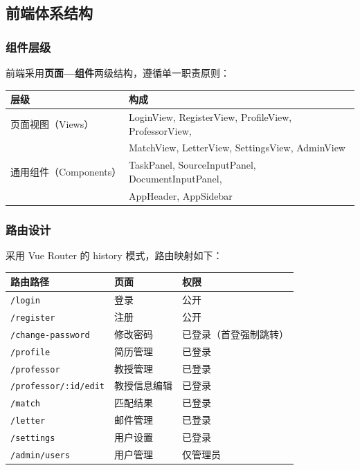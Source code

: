 \documentclass[11pt]{article}
\begin{document}
\subsection{前端体系结构}

\subsubsection{组件层级}

前端采用\textbf{页面—组件}两级结构，遵循单一职责原则：

\begin{center}
\begin{tabular}{|l|l|}
\hline
\textbf{层级} & \textbf{构成} \\
\hline
页面视图（Views） & LoginView, RegisterView, ProfileView, ProfessorView, \\
& MatchView, LetterView, SettingsView, AdminView \\
\hline
通用组件（Components） & TaskPanel, SourceInputPanel, DocumentInputPanel, \\
& AppHeader, AppSidebar \\
\hline
\end{tabular}
\end{center}

\subsubsection{路由设计}

采用 Vue Router 的 history 模式，路由映射如下：

\begin{center}
\begin{tabular}{|l|l|l|}
\hline
\textbf{路由路径} & \textbf{页面} & \textbf{权限} \\
\hline
\texttt{/login} & 登录 & 公开 \\
\texttt{/register} & 注册 & 公开 \\
\texttt{/change-password} & 修改密码 & 已登录（首登强制跳转） \\
\texttt{/profile} & 简历管理 & 已登录 \\
\texttt{/professor} & 教授管理 & 已登录 \\
\texttt{/professor/:id/edit} & 教授信息编辑 & 已登录 \\
\texttt{/match} & 匹配结果 & 已登录 \\
\texttt{/letter} & 邮件管理 & 已登录 \\
\texttt{/settings} & 用户设置 & 已登录 \\
\texttt{/admin/users} & 用户管理 & 仅管理员 \\
\hline
\end{tabular}
\end{center}
\end{document}
